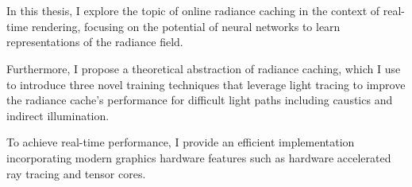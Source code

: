 

\chapter*{}
\label{sec:summary}

In this thesis, I explore the topic of online radiance caching in the context of real-time rendering, focusing on the potential of neural networks to learn representations of the radiance field.

Furthermore, I propose a theoretical abstraction of radiance caching, which I use to introduce three novel training techniques that leverage light tracing to improve the radiance cache's performance for difficult light paths including caustics and indirect illumination.

To achieve real-time performance, I provide an efficient implementation incorporating modern graphics hardware features such as hardware accelerated ray tracing and tensor cores.